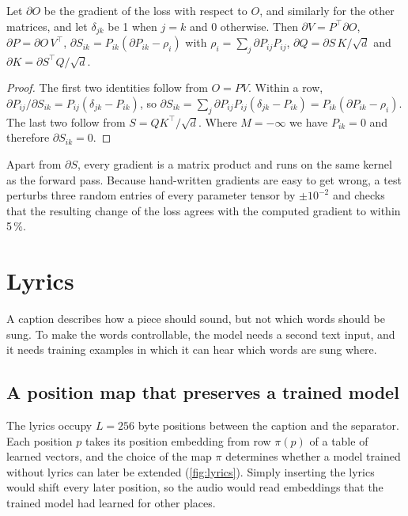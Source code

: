 \begin{proposition}
Let $\partial O$ be the gradient of the loss with respect to $O$, and similarly
for the other matrices, and let $\delta_{jk}$ be 1 when $j = k$ and 0 otherwise.
Then $\partial V = P^\top \partial O$,
$\partial P = \partial O\, V^\top$, $\partial S_{ik} = P_{ik}(\partial P_{ik} - \rho_i)$
with $\rho_i = \sum_j \partial P_{ij} P_{ij}$, $\partial Q = \partial S\, K/\sqrt d$ and
$\partial K = \partial S^\top Q/\sqrt d$.
\end{proposition}
\begin{proof}
The first two identities follow from $O = PV$. Within a row,
$\partial P_{ij}/\partial S_{ik} = P_{ij}(\delta_{jk} - P_{ik})$, so
$\partial S_{ik} = \sum_j \partial P_{ij} P_{ij} (\delta_{jk} - P_{ik}) = P_{ik}(\partial P_{ik} - \rho_i)$.
The last two follow from $S = QK^\top/\sqrt d$. Where $M = -\infty$ we have
$P_{ik} = 0$ and therefore $\partial S_{ik} = 0$.
\end{proof}

Apart from $\partial S$, every gradient is a matrix product and runs on the same
kernel as the forward pass. Because hand-written gradients are easy to get
wrong, a test perturbs three random entries of every parameter tensor by
$\pm 10^{-2}$ and checks that the resulting change of the loss agrees with the
computed gradient to within 5\,\%.

\section{Lyrics}
\label{sec:lyrics}

A caption describes how a piece should sound, but not which words should be
sung. To make the words controllable, the model needs a second text input,
and it needs training examples in which it can hear which words are sung
where.

\subsection{A position map that preserves a trained model}

The lyrics occupy $L = 256$ byte positions between the caption and the
separator. Each position $p$ takes its position embedding from row $\pi(p)$ of
a table of learned vectors, and the choice of the map $\pi$ determines whether
a model trained without lyrics can later be extended (\cref{fig:lyrics}).
Simply inserting the lyrics would shift every later position, so the audio
would read embeddings that the trained model had learned for other places.

